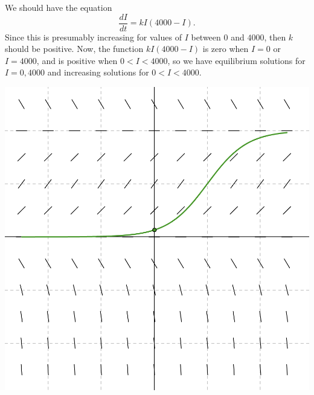 \documentclass[12pt]{amsart}
\numberwithin{equation}{section}
\theoremstyle{plain} %
\theoremstyle{definition}
\theoremstyle{remark}
\begin{document}
\begin{framed}
We should have the equation \[ \frac{dI}{dt} = k I (4000-I).\]
Since this is presumably increasing for values of $I$ between $0$ and $4000$, then $k$ should be positive.
Now, the function $k I (4000-I)$ is zero when $I=0$ or $I=4000$, and is positive when $0<I<4000$, so we have equilibrium solutions for $I=0,4000$ and increasing solutions for $0<I<4000$.
\begin{center}\includegraphics[scale=.5]{sf9}\end{center}
\end{framed}
\end{document}
